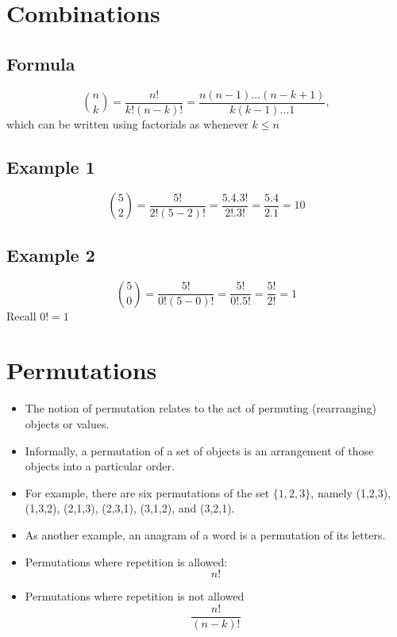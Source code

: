 \documentclass[a4paper,12pt]{article}
\begin{document}
\section*{Combinations}

\subsection*{Formula}
\[ \binom nk  = \frac{n!}{k!(n-k)!} = \frac{n(n-1)\ldots(n-k+1)}{k(k-1)\dots 1},\]
which can be written using factorials as  whenever $k\leq n$

\subsection*{Example 1}

\[ \binom 5 2  = \frac{5!}{2!(5-2)!} = \frac{5.4.3!}{2! .3!} = \frac{5.4}{2.1} = 10\]

\subsection*{Example 2}

\[ \binom 5 0  = \frac{5!}{0!(5-0)!} = \frac{5!}{0! .5!} = \frac{5!}{2!} = 1\]
Recall $0! =1$

\section{Permutations}

\begin{itemize}
\item The notion of permutation relates to the act of permuting (rearranging) objects or values. 
\item Informally, a permutation of a set of objects is an arrangement of those objects into a particular order. 

\item For example, there are six permutations of the set $\{1,2,3\}$, namely (1,2,3), (1,3,2), (2,1,3), (2,3,1), (3,1,2), and (3,2,1). 
\item As another example, an anagram of a word is a permutation of its letters. 

\end{itemize}





\begin{itemize}
\item Permutations where repetition is allowed: 
\[ n! \]
\item Permutations where repetition is not allowed
\[ \frac{n!}{(n-k)!} \]
\end{itemize}
\end{document}
